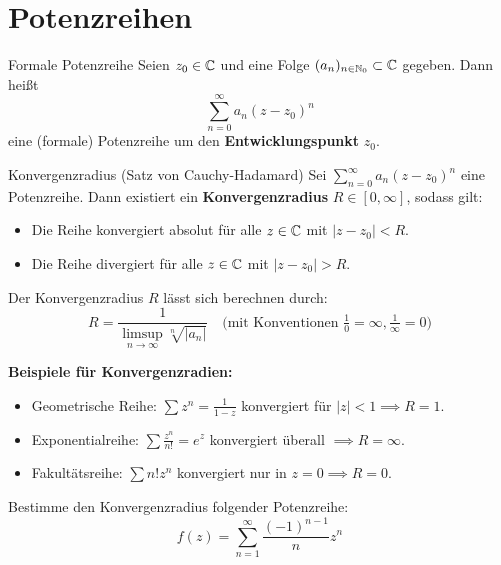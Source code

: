 \section{Potenzreihen}

\begin{defi}{Formale Potenzreihe}
Seien $z_0 \in \mathbb{C}$ und eine Folge $(a_n)_{n \in \mathbb{N}_0} \subset \mathbb{C}$ gegeben. Dann heißt 
\[
    \sum_{n=0}^\infty a_n (z-z_0)^n
\]
eine (formale) Potenzreihe um den \textbf{Entwicklungspunkt} $z_0$.
\end{defi}

\begin{satz}{Konvergenzradius (Satz von Cauchy-Hadamard)}
Sei $\sum_{n=0}^\infty a_n (z-z_0)^n$ eine Potenzreihe. Dann existiert ein \textbf{Konvergenzradius} $R \in [0, \infty]$, sodass gilt:
\begin{itemize}
    \item Die Reihe konvergiert absolut für alle $z \in \mathbb{C}$ mit $|z-z_0| < R$.
    \item Die Reihe divergiert für alle $z \in \mathbb{C}$ mit $|z-z_0| > R$.
\end{itemize}
Der Konvergenzradius $R$ lässt sich berechnen durch:
\[
    R = \frac{1}{\limsup_{n \to \infty} \sqrt[n]{|a_n|}} \quad \text{(mit Konventionen } \tfrac{1}{0}=\infty, \tfrac{1}{\infty}=0 \text{)}
\]
\end{satz}

\textbf{Beispiele für Konvergenzradien:}
\begin{itemize}
    \item Geometrische Reihe: $\sum z^n = \frac{1}{1-z}$ konvergiert für $|z|<1 \implies R = 1$.
    \item Exponentialreihe: $\sum \frac{z^n}{n!} = e^z$ konvergiert überall $\implies R = \infty$.
    \item Fakultätsreihe: $\sum n! z^n$ konvergiert nur in $z=0 \implies R = 0$.
\end{itemize}

\vspace{0.3cm}
\begin{tcolorbox}[colback=yellow!5!white, colframe=orange!75!black, fonttitle=\bfseries, title={Übungsblatt 1, Aufgabe 2}]
Bestimme den Konvergenzradius folgender Potenzreihe:
\[
    f(z) = \sum_{n=1}^\infty \frac{(-1)^{n-1}}{n} z^n
\]
\end{tcolorbox}
\vspace{0.3cm}


